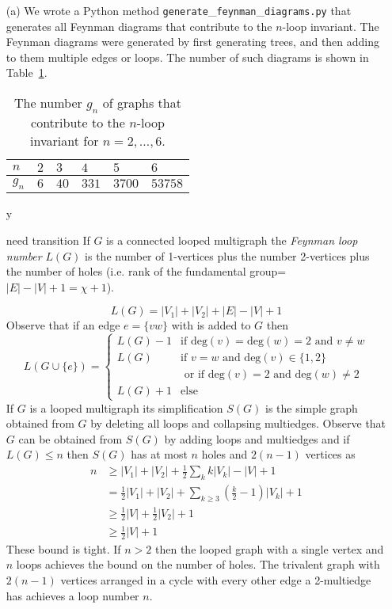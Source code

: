 \documentclass[12pt]{amsart}
\theoremstyle{definition}
\def\printname#1{
        \if\draft y
                \smash{\makebox[0pt]{\hspace{-0.5in}
                        \raisebox{8pt}{\tt\tiny #1}}}
        \fi
}
\def\lbl#1{\label{#1}\printname{#1}}
\def\deg{\mathrm{deg}}
\begin{document}
\begin{itemize}
\item[(a)] 
We wrote a Python method 
\texttt{generate}\_\texttt{feynman}\_\texttt{diagrams.py}
that generates all Feynman diagrams that contribute to the $n$-loop 
invariant. The Feynman diagrams were generated by first generating trees,
and then adding to them multiple edges or loops. The number of such diagrams 
is shown in Table~\ref{t.diagrams}.

\begin{table}
\begin{center}
\begin{tabular}{|l||l|l|l|l|l|}\hline
 $n$ & $2$ & $3$ & $4$ & $5$ & $6$ \\ \hline
$g_n$ & $6$ & $40$ & $331$ & $3700$ & $53758$ \\ \hline
\end{tabular}\vspace{.2cm}
\caption{The number $g_n$ of graphs that contribute to the $n$-loop 
invariant for $n=2,\dots,6$.} 
\lbl{t.diagrams}
\end{center}
\end{table}

{\color{red} need transition}
If $G$ is a connected looped multigraph the \emph{Feynman loop number} 
$L(G)$ is
the number of 1-vertices plus the number 2-vertices plus the number of holes
(i.e. rank of the fundamental group= $|E|-|V|+1 =\chi+1$).

$$
L(G)=|V_1|+|V_2|+|E|-|V|+1
$$
Observe that if an edge $e=\{vw\}$  with is added to $G$ then
$$
 L(G\cup\{e\}) =
  \begin{cases}
   L(G)-1 & \text{if } \deg(v)=\deg(w)=2 \mbox{ and } v \neq w \\
   L(G) & \text{if } v=w \mbox{ and } \deg(v) \in \{1,2\} \\
        & \text{ or if } \deg(v)=2 \mbox{ and } \deg(w) \neq 2 \\
   L(G)+1  &  \text{else}
  \end{cases}
$$     
If $G$ is a looped multigraph its simplification $S(G)$ is the simple graph
obtained from $G$ by deleting all loops and collapsing multiedges.
Observe that $G$ can be obtained from $S(G)$ by adding loops and multiedges and
if $L(G) \leq n$ then $S(G)$ has at most $n$ holes and $2(n-1)$ vertices as
\begin{align*}
n &\geq |V_1|+|V_2| + \frac 1 2 \sum_k k|V_k| -|V|+1 \\
&= \frac 1 2 |V_1| + |V_2| +\sum_{k\geq 3} \left (\frac k 2 - 1 \right) |V_k|+1 \\
&\geq \frac 1 2 |V|+\frac 1 2 |V_2|+1 \\
&\geq \frac 1 2 |V|+1 
\end{align*}
These bound is tight. If $n>2$ then the looped graph with a single vertex
and $n$ loops achieves the bound on the number of holes. 
The trivalent graph
with $2(n-1)$ vertices arranged in a cycle with every other edge a 2-multiedge
has  achieves a loop number $n$.


\end{itemize}
\end{document}
